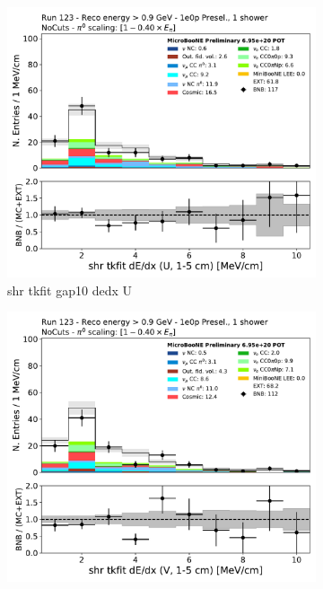 \begin{figure}[H]
    \centering
    \begin{subfigure}{0.3\textwidth}
    \includegraphics[width=1.0\textwidth]{1e0p/High_E_Sideband/shr_tkfit_gap10_dedx_U.pdf}
    \caption{shr tkfit gap10 dedx U}
    \end{subfigure}
    \begin{subfigure}{0.3\textwidth}
    \includegraphics[width=1.0\textwidth]{1e0p/High_E_Sideband/shr_tkfit_gap10_dedx_V.pdf}

\end{subfigure}
\end{figure}
